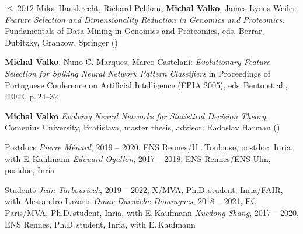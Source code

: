 \documentclass{resume}
\begin{document}
\begin{category}{$\leq\ 2012$}
\citembullet  
Milos Hauskrecht, Richard Pelikan, {\bf Michal Valko}, James Lyons-Weiler:
\emph{Feature Selection and Dimensionality Reduction in Genomics and
Proteomics}. Fundamentals of Data Mining in Genomics and Proteomics,
eds. Berrar, Dubitzky, Granzow. Springer ({})

\citembullet 
{\bf Michal Valko}, Nuno C. Marques, Marco Castelani: \emph{Evolutionary Feature
Selection for Spiking Neural Network Pattern Classifiers} in
Proceedings of Portuguese Conference on Artificial Intelligence
({\sf EPIA 2005}), eds.\,Bento et al., IEEE, p.\,24--32

\citembullet 
{\bf Michal Valko} \emph{Evolving Neural Networks for Statistical Decision
Theory}, Comenius University, Bratislava, master thesis, advisor: Radoslav Harman ({})

\end{category}
\begin{category}{Postdocs}
\citembullet \textit{Pierre M\'enard}, 2019 -- 2020,  ENS Rennes/U .\,Toulouse, postdoc, Inria, with E.\,Kaufmann 
\citembullet \textit{Edouard Oyallon}, 2017 -- 2018,  ENS Rennes/ENS Ulm, postdoc, Inria 
\end{category}
\begin{category}{Students}
\citembullet \textit{Jean Tarbouriech}, 2019 -- 2022,  X/MVA, Ph.D.\,student,
Inria/FAIR, with Alessandro Lazaric
\citembullet \textit{Omar Darwiche Domingues}, 2018 -- 2021,  EC Paris/MVA, Ph.D.\,student,
Inria, with E.\,Kaufmann
\citembullet \textit{Xuedong Shang}, 2017 -- 2020,  ENS Rennes, Ph.D.\,student,
Inria, with E.\,Kaufmann

\end{category}
\end{document}
